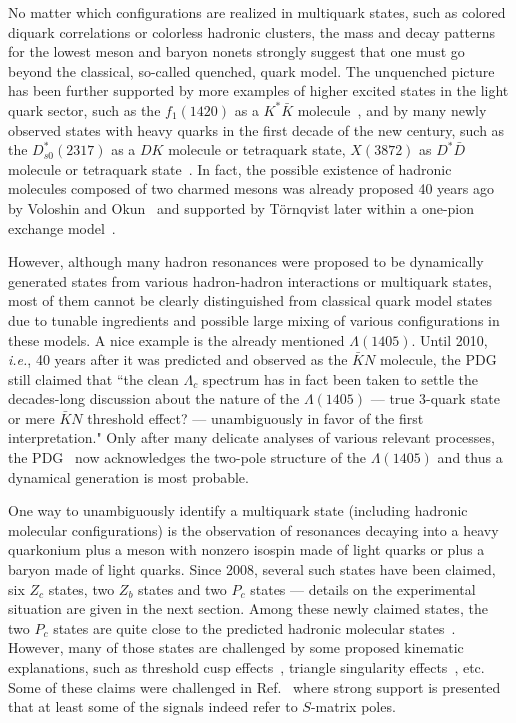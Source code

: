 No matter which configurations are realized in multiquark states, such as
colored diquark correlations or colorless hadronic clusters, the mass and decay
patterns for the lowest meson and baryon nonets strongly suggest that one must
go beyond the classical, so-called quenched, quark model. The unquenched picture
has been further supported by more examples of higher excited states in the
light quark sector, such as the $f_1(1420)$ as a $K^*\bar K$
molecule~\cite{Tornqvist:1993ng}, and by many newly observed states with heavy
quarks in the first decade of the new century, such as the $D^*_{s0}(2317)$ as a
$DK$ molecule or tetraquark state, $X(3872)$ as $D^*\bar D$ molecule or
tetraquark state~\cite{Chen:2016qju}. In fact, the possible existence of
hadronic molecules composed of two charmed mesons was already proposed 40 years
ago by Voloshin and Okun~\cite{Voloshin:1976ap} and supported by T{\"o}rnqvist
later within a one-pion exchange model~\cite{Tornqvist:1993ng}.

However, although many hadron resonances were proposed to be dynamically
generated states from various hadron-hadron interactions or multiquark states,
most of them cannot be clearly distinguished from classical quark model states
due to tunable ingredients and possible large mixing of various configurations
in these models.
A nice example is the already mentioned $\Lambda(1405)$.
Until 2010, {\sl i.e.}, 40 years after it  was predicted and observed as the
$\bar KN$ molecule, the PDG~\cite{Nakamura:2010zzi} still claimed that ``the
clean $\Lambda_c$ spectrum has in fact been taken to settle the decades-long
discussion about the nature of the $\Lambda(1405)$ --- true 3-quark state or
mere $\bar KN$ threshold effect? --- unambiguously in favor of the first
interpretation."  Only after many delicate analyses of various relevant
processes, the PDG~\cite{Olive:2016xmw} now acknowledges the two-pole structure
of the $\Lambda(1405)$ \cite{Oller:2000fj} and thus a dynamical generation is
most probable.

One way to unambiguously identify a multiquark state (including hadronic
molecular configurations) is the observation of resonances decaying into a heavy
quarkonium plus a meson with nonzero isospin made of light quarks or plus a
baryon made of light quarks. Since 2008, several such states have been claimed,
six $Z_c$ states, two $Z_b$ states and two $P_c$ states --- details on the
experimental situation are given in the next section. Among these newly claimed
states, the two $P_c$ states are quite close to the predicted hadronic molecular
states~\cite{Wu:2010jy,Wang:2011rga,Yang:2011wz,Xiao:2013yca}. However, many of
those states are challenged by some proposed kinematic explanations, such as threshold cusp
effects~\cite{Bugg:2011jr,Swanson:2014tra}, triangle singularity
effects~\cite{Chen:2013coa,Wang:2013cya,Guo:2015umn}, etc.
Some of these claims were challenged in Ref.~\cite{Guo:2014iya} where strong
support is presented that at least some of the signals indeed refer to
$S$-matrix poles.

